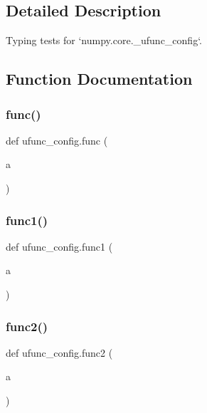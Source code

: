 \subsection{Detailed Description}
\begin{DoxyVerb}Typing tests for `numpy.core._ufunc_config`.\end{DoxyVerb}
 

\subsection{Function Documentation}
\mbox{\label{namespaceufunc__config_a1c463c1c3dd9c11b97230da590b6bd5f}} 
\subsubsection{\texorpdfstring{func()}{func()}}
{\footnotesize\ttfamily def ufunc\+\_\+config.\+func (\begin{DoxyParamCaption}\item[{}]{a }\end{DoxyParamCaption})}

\mbox{\label{namespaceufunc__config_a7272e7f989bc7000cb528dfbf119b7eb}} 
\subsubsection{\texorpdfstring{func1()}{func1()}}
{\footnotesize\ttfamily def ufunc\+\_\+config.\+func1 (\begin{DoxyParamCaption}\item[{}]{a }\end{DoxyParamCaption})}

\mbox{\label{namespaceufunc__config_a1378172851d8aa1659ba7098a2bb2fc5}} 
\subsubsection{\texorpdfstring{func2()}{func2()}}
{\footnotesize\ttfamily def ufunc\+\_\+config.\+func2 (\begin{DoxyParamCaption}\item[{}]{a }\end{DoxyParamCaption})}

